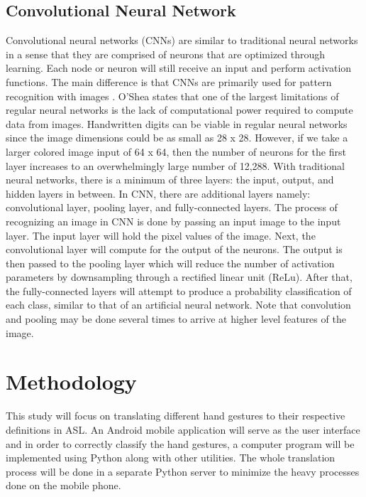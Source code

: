 \documentclass[journal]{./IEEE/IEEEtran}
\begin{document}
\subsection{Convolutional Neural Network}
Convolutional neural networks (CNNs) are similar to traditional neural networks in a sense that they are comprised of neurons that are optimized through learning. Each node or neuron will still receive an input and perform activation functions. The main difference is that CNNs are primarily used for pattern recognition with images \cite{OShea2015}.
\newline
\indent O'Shea \cite{OShea2015} states that one of the largest limitations of regular neural networks is the lack of computational power required to compute data from images. Handwritten digits can be viable in regular neural networks since the image dimensions could be as small as 28 x 28. However, if we take a larger colored image input of 64 x 64, then the number of neurons for the first layer increases to an overwhelmingly large number of 12,288.
\newline 
\indent With traditional neural networks, there is a minimum of three layers: the input, output, and hidden layers in between. In CNN, there are additional layers namely: convolutional layer, pooling layer, and fully-connected layers. The process of recognizing an image in CNN is done by passing an input image to the input layer. The input layer will hold the pixel values of the image. Next, the convolutional layer will compute for the output of the neurons. The output is then passed to the pooling layer which will reduce the number of activation parameters by downsampling through a rectified linear unit (ReLu). After that, the fully-connected layers will attempt to produce a probability classification of each class, similar to that of an artificial neural network. Note that convolution and pooling may be done several times to arrive at higher level features of the image.

\section{Methodology}
This study will focus on translating different hand gestures to their respective definitions in ASL. An Android mobile application will serve as the user interface and in order to correctly classify the hand gestures, a computer program will be implemented using Python along with other utilities. The whole translation process will be done in a separate Python server to minimize the heavy processes done on the mobile phone.
\end{document}
